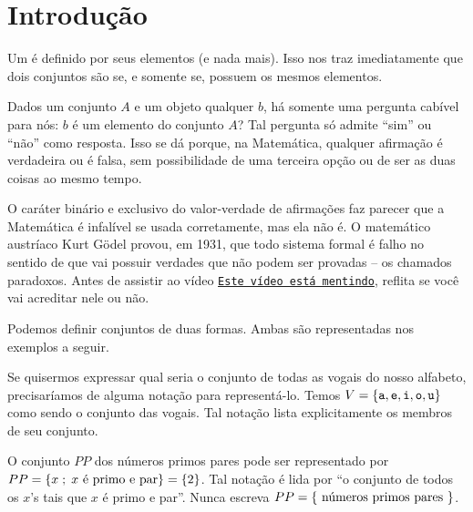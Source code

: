 \section{Introdução}
\label{sec:intro}

Um  é definido por seus elementos (e nada mais). Isso nos traz imediatamente que dois conjuntos são  se, e somente se, possuem os mesmos elementos.

Dados um conjunto $A$ e um objeto qualquer $b$, há somente uma pergunta cabível para nós: $b$ é um elemento do conjunto $A$? Tal pergunta só admite ``sim'' ou ``não'' como resposta. Isso se dá porque, na Matemática, qualquer afirmação é verdadeira ou é falsa, sem possibilidade de uma terceira opção ou de ser as duas coisas ao mesmo tempo. 

O caráter binário e exclusivo do valor-verdade de afirmações faz parecer que a Matemática é infalível se usada corretamente, mas ela não é. O matemático austríaco Kurt Gödel provou, em 1931, que todo sistema formal é falho no sentido de que vai possuir verdades que não podem ser provadas -- os chamados paradoxos. Antes de assistir ao vídeo \href{https://youtu.be/UI1xR_AECrU}{{\tt Este vídeo está mentindo}}, reflita se você vai acreditar nele ou não.

\begin{remark}
Podemos definir conjuntos de duas formas. Ambas são representadas nos exemplos a seguir.
\end{remark}

\begin{example}
\label{ex-vogais}
Se quisermos expressar qual seria o conjunto de todas as vogais do nosso alfabeto, precisaríamos de alguma notação para representá-lo. 
Temos $V=\left\{ \texttt{a}, \texttt{e}, \texttt{i}, \texttt{o}, \texttt{u}\right\}$ como sendo o conjunto das vogais. Tal notação lista explicitamente os membros de seu conjunto.
\end{example}

\begin{example}
\label{ex-primos-pares}
O conjunto $PP$ dos números primos pares pode ser representado por $PP = \left\{ x \;;\; x \text{ é primo e par}\right\} = \left\{ 2\right\}$. Tal notação é lida por ``o conjunto de todos os $x$'s tais que $x$ é primo e par''. Nunca escreva $PP = \left\{ \text{ números primos pares }\right\}$.
\end{example}

%

